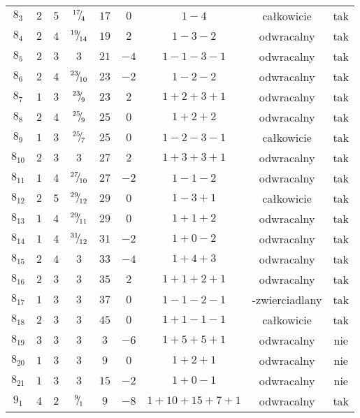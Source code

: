 \begin{longtable}{ccccccccc}
$8_{3}$ & $2$ & $5$ & ${}^{17}{\mskip -5mu/\mskip -3mu}_{4}$ & $17$ & $0$ & $1-4$ & całkowicie & tak \\
$8_{4}$ & $2$ & $4$ & ${}^{19}{\mskip -5mu/\mskip -3mu}_{14}$ & $19$ & $2$ & $1-3-2$ & odwracalny & tak \\
$8_{5}$ & $2$ & $3$ & $3$ & $21$ & $-4$ & $1-1-3-1$ & odwracalny & tak \\
$8_{6}$ & $2$ & $4$ & ${}^{23}{\mskip -5mu/\mskip -3mu}_{10}$ & $23$ & $-2$ & $1-2-2$ & odwracalny & tak \\
$8_{7}$ & $1$ & $3$ & ${}^{23}{\mskip -5mu/\mskip -3mu}_{9}$ & $23$ & $2$ & $1+2+3+1$ & odwracalny & tak \\
$8_{8}$ & $2$ & $4$ & ${}^{25}{\mskip -5mu/\mskip -3mu}_{9}$ & $25$ & $0$ & $1+2+2$ & odwracalny & tak \\
$8_{9}$ & $1$ & $3$ & ${}^{25}{\mskip -5mu/\mskip -3mu}_{7}$ & $25$ & $0$ & $1-2-3-1$ & całkowicie & tak \\
$8_{10}$ & $2$ & $3$ & $3$ & $27$ & $2$ & $1+3+3+1$ & odwracalny & tak \\
$8_{11}$ & $1$ & $4$ & ${}^{27}{\mskip -5mu/\mskip -3mu}_{10}$ & $27$ & $-2$ & $1-1-2$ & odwracalny & tak \\
$8_{12}$ & $2$ & $5$ & ${}^{29}{\mskip -5mu/\mskip -3mu}_{12}$ & $29$ & $0$ & $1-3+1$ & całkowicie & tak \\
$8_{13}$ & $1$ & $4$ & ${}^{29}{\mskip -5mu/\mskip -3mu}_{11}$ & $29$ & $0$ & $1+1+2$ & odwracalny & tak \\
$8_{14}$ & $1$ & $4$ & ${}^{31}{\mskip -5mu/\mskip -3mu}_{12}$ & $31$ & $-2$ & $1+0-2$ & odwracalny & tak \\
$8_{15}$ & $2$ & $4$ & $3$ & $33$ & $-4$ & $1+4+3$ & odwracalny & tak \\
$8_{16}$ & $2$ & $3$ & $3$ & $35$ & $2$ & $1+1+2+1$ & odwracalny & tak \\
$8_{17}$ & $1$ & $3$ & $3$ & $37$ & $0$ & $1-1-2-1$ & -zwierciadlany & tak \\
$8_{18}$ & $2$ & $3$ & $3$ & $45$ & $0$ & $1+1-1-1$ & całkowicie & tak \\
$8_{19}$ & $3$ & $3$ & $3$ & $3$ & $-6$ & $1+5+5+1$ & odwracalny & nie \\
$8_{20}$ & $1$ & $3$ & $3$ & $9$ & $0$ & $1+2+1$ & odwracalny & nie \\
$8_{21}$ & $1$ & $3$ & $3$ & $15$ & $-2$ & $1+0-1$ & odwracalny & nie \\
$9_{1}$ & $4$ & $2$ & ${}^{9}{\mskip -5mu/\mskip -3mu}_{1}$ & $9$ & $-8$ & $1+10+15+7+1$ & odwracalny & tak \\

\end{longtable}
